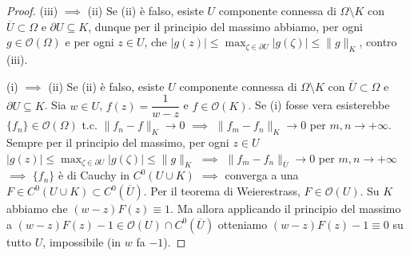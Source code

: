 \begin{proof}
  (iii) $\implies$ (ii) Se (ii) è falso, esiste $U$ componente connessa di $\Omega \setminus K$ con $\overline{U} \subset \Omega$ e $\partial U \subseteq K$, dunque per il principio del massimo abbiamo, per ogni $g \in \mathcal{O}(\Omega)$ e per ogni $z \in U$, che $|g(z)|\le \max_{\zeta \in \partial U} |g(\zeta)| \le \|g\|_K$, contro (iii).

  (i) $\implies$ (ii) Se (ii) è falso, esiste $U$ componente connessa di $\Omega \setminus K$ con $\overline{U} \subset \Omega$ e $\partial U \subseteq K$. Sia $w \in U$, $f(z)=\dfrac{1}{w-z}$ e $f \in \mathcal{O}(K)$.
  Se (i) fosse vera esisterebbe $\{f_n\} \in \mathcal{O}(\Omega)$ t.c. $\|f_n-f\|_K \longrightarrow 0$ $\implies$ $\|f_m-f_n\|_K \longrightarrow 0$ per $m, n \longrightarrow +\infty$.
  Sempre per il principio del massimo, per ogni $z \in U$ $|g(z)|\le \max_{\zeta \in \partial U} |g(\zeta)| \le \|g\|_K$ $\implies$ $\|f_m-f_n\|_{\overline{U}} \longrightarrow 0$ per $m,n \longrightarrow +\infty$ $\implies$ $\{f_n\}$ è di Cauchy in $C^0(U \cup K)$ $\implies$ converga a una $F \in C^0(U \cup K) \subset C^0(\overline{U})$.
  Per il teorema di Weierestrass, $F \in \mathcal{O}(U)$. Su $K$ abbiamo che $(w-z)F(z)\equiv 1$. Ma allora applicando il principio del massimo a $(w-z)F(z)-1 \in \mathcal{O}(U) \cap C^0(\overline{U})$ otteniamo $(w-z)F(z)-1 \equiv 0$ su tutto $U$, impossibile (in $w$ fa $-1$).


\end{proof}
